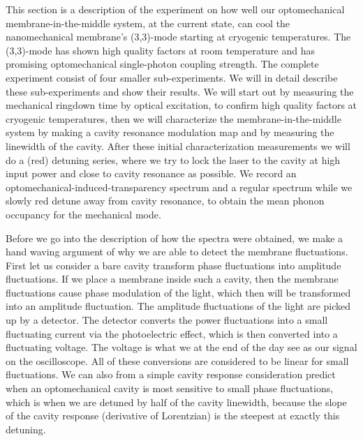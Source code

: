 This section is a description of the experiment on how well our optomechanical membrane-in-the-middle system, at the current state, can cool the nanomechanical membrane's (3,3)-mode starting at cryogenic temperatures. The (3,3)-mode has shown high quality factors at room temperature and has promising optomechanical single-photon coupling strength. The complete experiment consist of four smaller sub-experiments. We will in detail describe these sub-experiments and show their results. We will start out by measuring the mechanical ringdown time by optical excitation, to confirm high quality factors at cryogenic temperatures, then we will characterize the membrane-in-the-middle system by making a cavity resonance modulation map and by measuring the linewidth of the cavity. After these initial characterization measurements we will do a (red) detuning series, where we try to lock the laser to the cavity at high input power and close to cavity resonance as possible. We record an optomechanical-induced-transparency spectrum and a regular spectrum while we slowly red detune away from cavity resonance, to obtain the mean phonon occupancy for the mechanical mode.

Before we go into the description of how the spectra were obtained, we make a hand waving argument of why we are able to detect the membrane fluctuations. First let us consider a bare cavity transform phase fluctuations into amplitude fluctuations. If we place a membrane inside such a cavity, then the membrane fluctuations cause phase modulation of the light, which then will be transformed into an amplitude fluctuation. The amplitude fluctuations of the light are picked up by a detector. The detector converts the power fluctuations into a small fluctuating current via the photoelectric effect, which is then converted into a fluctuating voltage. The voltage is what we at the end of the day see as our signal on the oscilloscope. All of these conversions are considered to be linear for small fluctuations. We can also from a simple cavity response consideration predict when an optomechanical cavity is most sensitive to small phase fluctuations, which is when we are detuned by half of the cavity linewidth, because the slope of the cavity response (derivative of Lorentzian) is the steepest at exactly this detuning.